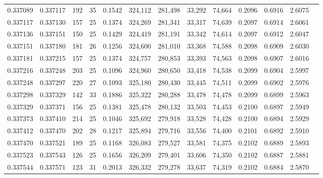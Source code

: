 \begin{tabular}{rrrrrrrrrrrrr}
0.337089 & 0.337117 &   192 &  35 &                                     0.1542 & 324,112 & 281,498 &  33,292 &  74,664 & 0.2096 & 0.6916 & 2.6075 \\
0.337117 & 0.337130 &   157 &  25 &                                     0.1374 & 324,269 & 281,341 &  33,317 &  74,639 & 0.2097 & 0.6914 & 2.6061 \\
0.337136 & 0.337151 &   150 &  25 &                                     0.1429 & 324,419 & 281,191 &  33,342 &  74,614 & 0.2097 & 0.6912 & 2.6047 \\
0.337151 & 0.337180 &   181 &  26 &                                     0.1256 & 324,600 & 281,010 &  33,368 &  74,588 & 0.2098 & 0.6909 & 2.6030 \\
0.337181 & 0.337215 &   157 &  25 &                                     0.1374 & 324,757 & 280,853 &  33,393 &  74,563 & 0.2098 & 0.6907 & 2.6016 \\
0.337216 & 0.337248 &   203 &  25 &                                     0.1096 & 324,960 & 280,650 &  33,418 &  74,538 & 0.2099 & 0.6904 & 2.5997 \\
0.337248 & 0.337297 &   220 &  27 &                                     0.1093 & 325,180 & 280,430 &  33,445 &  74,511 & 0.2099 & 0.6902 & 2.5976 \\
0.337298 & 0.337329 &   142 &  33 &                                     0.1886 & 325,322 & 280,288 &  33,478 &  74,478 & 0.2099 & 0.6899 & 2.5963 \\
0.337329 & 0.337371 &   156 &  25 &                                     0.1381 & 325,478 & 280,132 &  33,503 &  74,453 & 0.2100 & 0.6897 & 2.5949 \\
0.337373 & 0.337410 &   214 &  25 &                                     0.1046 & 325,692 & 279,918 &  33,528 &  74,428 & 0.2100 & 0.6894 & 2.5929 \\
0.337412 & 0.337470 &   202 &  28 &                                     0.1217 & 325,894 & 279,716 &  33,556 &  74,400 & 0.2101 & 0.6892 & 2.5910 \\
0.337470 & 0.337521 &   189 &  25 &                                     0.1168 & 326,083 & 279,527 &  33,581 &  74,375 & 0.2102 & 0.6889 & 2.5893 \\
0.337523 & 0.337543 &   126 &  25 &                                     0.1656 & 326,209 & 279,401 &  33,606 &  74,350 & 0.2102 & 0.6887 & 2.5881 \\
0.337544 & 0.337571 &   123 &  31 &                                     0.2013 & 326,332 & 279,278 &  33,637 &  74,319 & 0.2102 & 0.6884 & 2.5870 \\

\end{tabular}
